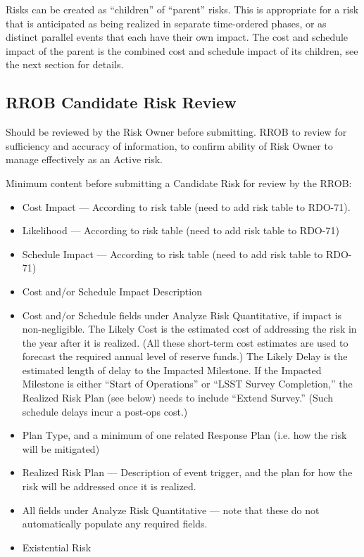 Risks can be created as ``children'' of ``parent'' risks.
This is appropriate for a risk that is anticipated as being realized in separate time-ordered phases, or as distinct parallel events that each have their own impact.
The cost and schedule impact of the parent is the combined cost and schedule impact of its children, see the next section for details.

\subsection{RROB Candidate Risk Review}

Should be reviewed by the Risk Owner before submitting.
RROB to review for sufficiency and accuracy of information, to confirm ability of Risk Owner to manage effectively as an Active risk.

Minimum content before submitting a Candidate Risk for review by the RROB:
\begin{itemize}
	\item Cost Impact --- According to risk table (need to add risk table to RDO-71).
	\item Likelihood --- According to risk table (need to add risk table to RDO-71)
	\item Schedule Impact --- According to risk table (need to add risk table to RDO-71)
	\item Cost and/or Schedule Impact Description
	\item Cost and/or Schedule fields under Analyze Risk Quantitative, if impact is non-negligible.
	The Likely Cost is the estimated cost of addressing the risk in the year after it is realized.
	(All these short-term cost estimates are used to forecast the required annual level of reserve funds.)
	The Likely Delay is the estimated length of delay to the Impacted Milestone.
	If the Impacted Milestone is either ``Start of Operations'' or ``LSST Survey Completion,'' the Realized Risk Plan (see below) needs to include ``Extend Survey.''
	(Such schedule delays incur a post-ops cost.)
	\item Plan Type, and a minimum of one related Response Plan (i.e. how the risk will be mitigated)
	\item Realized Risk Plan --- Description of event trigger, and the plan for how the risk will be addressed once it is realized.
	\item All fields under Analyze Risk Quantitative --- note that these do not automatically populate any required fields.
	\item Existential Risk
\end{itemize}


